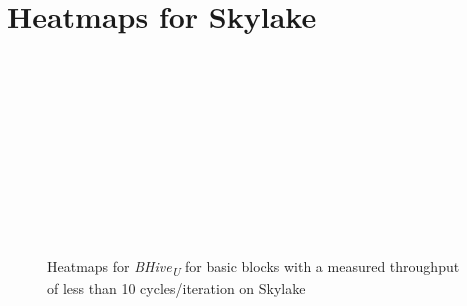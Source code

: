 \documentclass[sigconf,nonacm]{acmart}
\newcommand{\bhiveu}{\emph{BHive\textsubscript{U}}\xspace}
\begin{document}
\section{Heatmaps for Skylake}
\vfill
\begin{figure}[H]
\centering
\begin{subfigure}[t]{0.33\textwidth}\end{subfigure}~
\begin{subfigure}[t]{0.33\textwidth}\end{subfigure}~
\begin{subfigure}[t]{0.33\textwidth}\end{subfigure}\par\bigskip

\begin{subfigure}[t]{0.33\textwidth}\end{subfigure}~
\begin{subfigure}[t]{0.33\textwidth}\end{subfigure}~
\begin{subfigure}[t]{0.33\textwidth}\end{subfigure}\par\bigskip

\begin{subfigure}[t]{0.33\textwidth}\end{subfigure}~
\begin{subfigure}[t]{0.33\textwidth}\end{subfigure}
~\begin{subfigure}[t]{0.33\textwidth}\end{subfigure}
\caption{Heatmaps for \bhiveu for basic blocks with a measured throughput of less than 10 cycles/iteration on Skylake}
\end{figure}
\vfill
\end{document}
